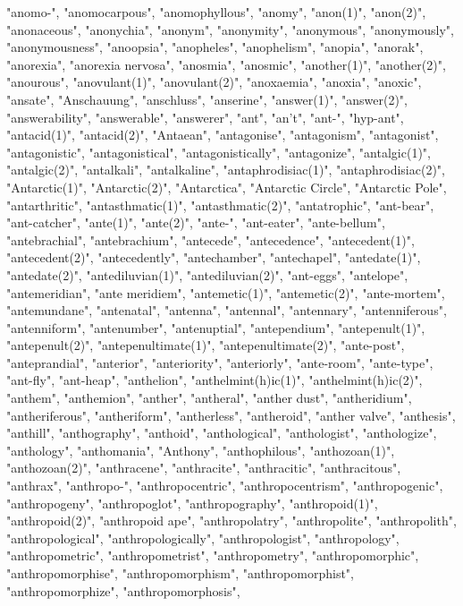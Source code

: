"anomo-",
"anomocarpous",
"anomophyllous",
"anomy",
"anon(1)",
"anon(2)",
"anonaceous",
"anonychia",
"anonym",
"anonymity",
"anonymous",
"anonymously",
"anonymousness",
"anoopsia",
"anopheles",
"anophelism",
"anopia",
"anorak",
"anorexia",
"anorexia nervosa",
"anosmia",
"anosmic",
"another(1)",
"another(2)",
"anourous",
"anovulant(1)",
"anovulant(2)",
"anoxaemia",
"anoxia",
"anoxic",
"ansate",
"Anschauung",
"anschluss",
"anserine",
"answer(1)",
"answer(2)",
"answerability",
"answerable",
"answerer",
"ant",
"an't",
"ant-",
"hyp-ant",
"antacid(1)",
"antacid(2)",
"Antaean",
"antagonise",
"antagonism",
"antagonist",
"antagonistic",
"antagonistical",
"antagonistically",
"antagonize",
"antalgic(1)",
"antalgic(2)",
"antalkali",
"antalkaline",
"antaphrodisiac(1)",
"antaphrodisiac(2)",
"Antarctic(1)",
"Antarctic(2)",
"Antarctica",
"Antarctic Circle",
"Antarctic Pole",
"antarthritic",
"antasthmatic(1)",
"antasthmatic(2)",
"antatrophic",
"ant-bear",
"ant-catcher",
"ante(1)",
"ante(2)",
"ante-",
"ant-eater",
"ante-bellum",
"antebrachial",
"antebrachium",
"antecede",
"antecedence",
"antecedent(1)",
"antecedent(2)",
"antecedently",
"antechamber",
"antechapel",
"antedate(1)",
"antedate(2)",
"antediluvian(1)",
"antediluvian(2)",
"ant-eggs",
"antelope",
"antemeridian",
"ante meridiem",
"antemetic(1)",
"antemetic(2)",
"ante-mortem",
"antemundane",
"antenatal",
"antenna",
"antennal",
"antennary",
"antenniferous",
"antenniform",
"antenumber",
"antenuptial",
"antependium",
"antepenult(1)",
"antepenult(2)",
"antepenultimate(1)",
"antepenultimate(2)",
"ante-post",
"anteprandial",
"anterior",
"anteriority",
"anteriorly",
"ante-room",
"ante-type",
"ant-fly",
"ant-heap",
"anthelion",
"anthelmint(h)ic(1)",
"anthelmint(h)ic(2)",
"anthem",
"anthemion",
"anther",
"antheral",
"anther dust",
"antheridium",
"antheriferous",
"antheriform",
"antherless",
"antheroid",
"anther valve",
"anthesis",
"anthill",
"anthography",
"anthoid",
"anthological",
"anthologist",
"anthologize",
"anthology",
"anthomania",
"Anthony",
"anthophilous",
"anthozoan(1)",
"anthozoan(2)",
"anthracene",
"anthracite",
"anthracitic",
"anthracitous",
"anthrax",
"anthropo-",
"anthropocentric",
"anthropocentrism",
"anthropogenic",
"anthropogeny",
"anthropoglot",
"anthropography",
"anthropoid(1)",
"anthropoid(2)",
"anthropoid ape",
"anthropolatry",
"anthropolite",
"anthropolith",
"anthropological",
"anthropologically",
"anthropologist",
"anthropology",
"anthropometric",
"anthropometrist",
"anthropometry",
"anthropomorphic",
"anthropomorphise",
"anthropomorphism",
"anthropomorphist",
"anthropomorphize",
"anthropomorphosis",
